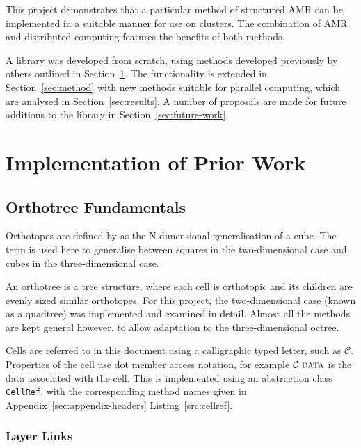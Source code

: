 \documentclass[twoside]{IIBproject}
\newcommand{\acc}{{\mkern 0.5mu\cdot\mkern 0.5mu}}
\numberwithin{figure}{section}
\begin{document}
    This project demonstrates that a particular method of structured AMR can be implemented in a suitable manner for use on clusters. The combination of AMR and distributed computing features the benefits of both methods. 

    A library was developed from scratch, using methods developed previously by others outlined in Section~\ref{sec:existingmethods}. The functionality is extended in Section~\ref{sec:method} with new methods suitable for parallel computing, which are analysed in Section~\ref{sec:results}. A number of proposals are made for future additions to the library in Section~\ref{sec:future-work}. 


\section{Implementation of Prior Work}
    \label{sec:existingmethods}

    \subsection{Orthotree Fundamentals} %
        \label{sec:orthotree}

        Orthotopes are defined by \cite{coxeter73} as the N-dimensional generalisation of a cube. The term is used here to generalise between squares in the two-dimensional case and cubes in the three-dimensional case.

        An orthotree is a tree structure, where each cell is orthotopic and its children are evenly sized similar orthotopes. For this project, the two-dimensional case (known as a quadtree) was implemented and examined in detail. Almost all the methods are kept general however, to allow adaptation to the three-dimensional octree. 

        Cells are referred to in this document using a calligraphic typed letter, such as $\mathcal{C}$. Properties of the cell use dot member access notation, for example $\mathcal{C}\acc\textproc{data}$ is the data associated with the cell. This is implemented using an abstraction class \texttt{CellRef}, with the corresponding method names given in Appendix~\ref{sec:appendix-headers} Listing~\ref{src:cellref}.


        \subsubsection{Layer Links} %
            \label{sec:orthotree-layers}
\end{document}
